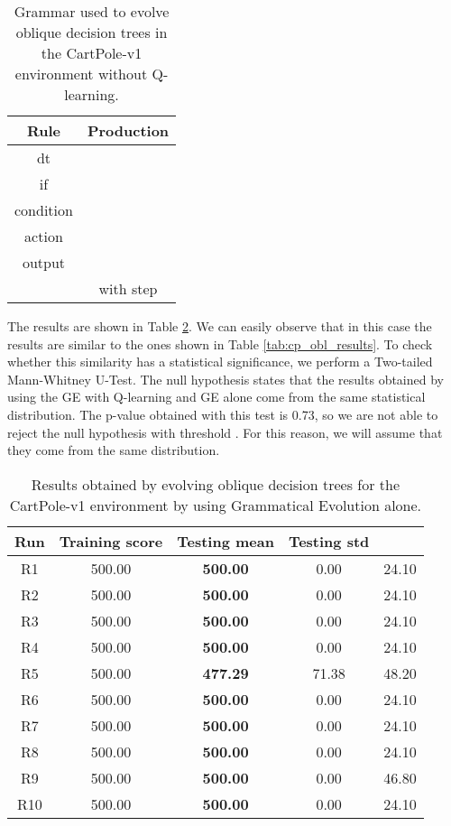 \documentclass[review,english]{elsarticle}
\begin{document}
\begin{table}
    \centering
    \begin{tabular}{|c|c|} \hline
        \textbf{Rule} & \textbf{Production} \\ \hline
        dt &  \\ if &  \\ condition &  \\ action &  \\ output &  \\  &  with step  \\ \hline
    \end{tabular}
    \caption{Grammar used to evolve oblique decision trees in the CartPole-v1 environment without Q-learning.}
    \label{tab:cp_abl_obl_grammar}
\end{table}

The results are shown in Table \ref{tab:cp_abl_obl_results}.
We can easily observe that in this case the results are similar to the ones shown in Table \ref{tab:cp_obl_results}.
To check whether this similarity has a statistical significance, we perform a Two-tailed Mann-Whitney U-Test.
The null hypothesis states that the results obtained by using the GE with Q-learning and GE alone come from the same statistical distribution.
The p-value obtained with this test is 0.73, so we are not able to reject the null hypothesis with threshold .
For this reason, we will assume that they come from the same distribution.


\begin{table}[ht]
    \centering
    \begin{tabular}{|c|c|c|c|c|} \hline
        \textbf{Run} & \textbf{Training score} & \textbf{Testing mean} & \textbf{Testing std} & \textbf{} \\ \hline
        R1 & 500.00 & \textbf{500.00} & 0.00 & 24.10 \\ R2 & 500.00 & \textbf{500.00} & 0.00 & 24.10 \\ R3 & 500.00 & \textbf{500.00} & 0.00 & 24.10 \\ R4 & 500.00 & \textbf{500.00} & 0.00 & 24.10 \\ R5 & 500.00 & \textbf{477.29} & 71.38 & 48.20 \\ R6 & 500.00 & \textbf{500.00} & 0.00 & 24.10 \\ R7 & 500.00 & \textbf{500.00} & 0.00 & 24.10 \\ R8 & 500.00 & \textbf{500.00} & 0.00 & 24.10 \\ R9 & 500.00 & \textbf{500.00} & 0.00 & 46.80 \\ R10 & 500.00 & \textbf{500.00} & 0.00 & 24.10 \\ \hline
    \end{tabular}
    \caption{Results obtained by evolving oblique decision trees for the CartPole-v1 environment by using Grammatical Evolution alone.}
    \label{tab:cp_abl_obl_results}
\end{table}
\end{document}
